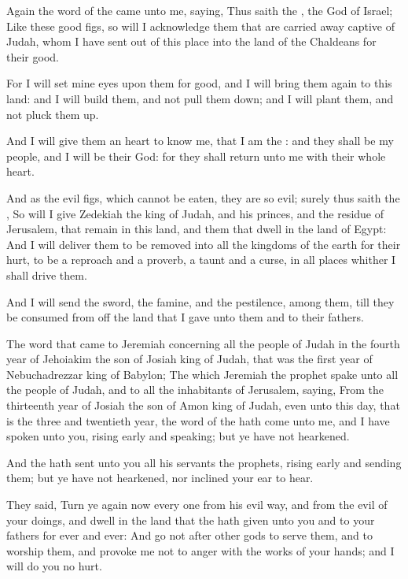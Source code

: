 \Verse Again the word of the \LORD came unto me, saying, \Verse Thus saith the \LORD, the God of Israel; Like these good figs, so will I acknowledge them that are carried away captive of Judah, whom I have sent out of this place into the land of the Chaldeans for their good.

\Verse For I will set mine eyes upon them for good, and I will bring them again to this land: and I will build them, and not pull them down; and I will plant them, and not pluck them up.

\Verse And I will give them an heart to know me, that I am the \LORD: and they shall be my people, and I will be their God: for they shall return unto me with their whole heart.

\Verse And as the evil figs, which cannot be eaten, they are so evil; surely thus saith the \LORD, So will I give Zedekiah the king of Judah, and his princes, and the residue of Jerusalem, that remain in this land, and them that dwell in the land of Egypt: \Verse And I will deliver them to be removed into all the kingdoms of the earth for their hurt, to be a reproach and a proverb, a taunt and a curse, in all places whither I shall drive them.

\Verse And I will send the sword, the famine, and the pestilence, among them, till they be consumed from off the land that I gave unto them and to their fathers.


\Chapter
\Verse The word that came to Jeremiah concerning all the people of Judah in the fourth year of Jehoiakim the son of Josiah king of Judah, that was the first year of Nebuchadrezzar king of Babylon; \Verse The which Jeremiah the prophet spake unto all the people of Judah, and to all the inhabitants of Jerusalem, saying, \Verse From the thirteenth year of Josiah the son of Amon king of Judah, even unto this day, that is the three and twentieth year, the word of the \LORD hath come unto me, and I have spoken unto you, rising early and speaking; but ye have not hearkened.

\Verse And the \LORD hath sent unto you all his servants the prophets, rising early and sending them; but ye have not hearkened, nor inclined your ear to hear.

\Verse They said, Turn ye again now every one from his evil way, and from the evil of your doings, and dwell in the land that the \LORD hath given unto you and to your fathers for ever and ever: \Verse And go not after other gods to serve them, and to worship them, and provoke me not to anger with the works of your hands; and I will do you no hurt.

